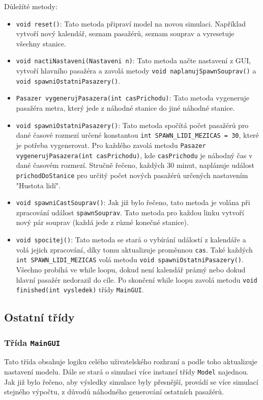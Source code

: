 \documentclass[12pt, a4paper]{article}
\begin{document}
Důležíté metody:
\begin{itemize}
    \item \texttt{void reset()}: Tato metoda připraví model na novou simulaci. Například vytvoří nový kalendář, seznam pasažérů, seznam souprav a vyresetuje všechny stanice.
    \item \texttt{void nactiNastaveni(Nastaveni n)}: Tato metoda načte nastavení z GUI, vytvoří hlavního pasažéra a zavolá metody \texttt{void naplanujSpawnSouprav()} a \texttt{void spawniOstatniPasazery()}.
    \item \texttt{Pasazer vygenerujPasazera(int casPrichodu)}: Tato metoda vygeneruje pasažéra metra, který jede z náhodné stanice do jiné náhodné stanice.
    \item \texttt{void spawniOstatniPasazery()}: Tato metoda spočítá počet pasažérů pro dané časové rozmezí určené konstantou \texttt{int SPAWN\_LIDI\_MEZICAS = 30}, které je potřeba vygenerovat. Pro každého zavolá metodu \texttt{Pasazer vygenerujPasazera(int casPrichodu)}, kde \texttt{casPrichodu} je náhodný čas v dané časovém rozmezí. Stručně řečeno, každých 30 minut, naplánuje událost \texttt{prichodDoStanice} pro určitý počet nových pasažérů určených nastavením "Hustota lidí".
    \item \texttt{void spawniCastSouprav()}: Jak již bylo řečeno, tato metoda je volána při zpracování událost \texttt{spawnSouprav}. Tato metoda pro každou linku vytvoří nový pár souprav (každá jede z různé konečné stanice).
    \item \texttt{void spocitej()}: Tato metoda se stará o vybírání událostí z kalendáře a volá jejich zpracování, díky tomu aktualizuje proměnnou \texttt{cas}. Také každých \texttt{int SPAWN\_LIDI\_MEZICAS} volá metodu \texttt{void spawniOstatniPasazery()}. Všechno probíhá ve while loopu, dokud není kalendář prázný nebo dokud hlavní pasažér nedorazil do cíle. Po skončení while loopu zavolá metodu \texttt{void finished(int vysledek)} třídy \texttt{MainGUI}.
\end{itemize}

\subsection{Ostatní třídy}
\subsubsection{Třída \texttt{MainGUI}}
Tato třída obsahuje logiku celého uživatelského rozhraní a podle toho aktualizuje nastavení modelu. Dále se stará o simulaci více instancí třídy \texttt{Model} najednou. Jak již bylo řečeno, aby výsledky simulace byly přesnější, provádí se více simulací stejného výpočtu, z důvodů náhodného generování ostatních pasažérů.
\end{document}
